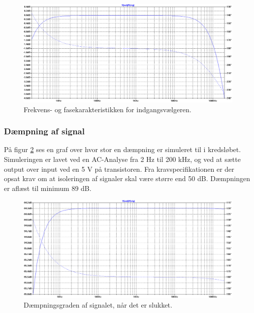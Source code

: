 \begin{figure}[h]
\centering
\includegraphics[width=\textwidth]{teknisk/indgangsvaelger/simulering/frekvenskarakteristik.png}
\caption{Frekvens- og fasekarakteristikken for indgangsvælgeren.}
\label{indgangsvaelger_frekvenskarakteristik}
\end{figure}

\subsubsection*{Dæmpning af signal}
På figur \ref{indgangsvaelger_daempniing} ses en graf over hvor stor en dæmpning er simuleret til i kredsløbet. Simuleringen er lavet ved en AC-Analyse fra 2 Hz til 200 kHz, og ved at sætte output over input ved en 5 V på transistoren. Fra kravspecifikationen er der opsat krav om at isoleringen af signaler skal være større end 50 dB. Dæmpningen er aflæst til minimum 89 dB.
\begin{figure}[h]
\centering
\includegraphics[width=\textwidth]{teknisk/indgangsvaelger/simulering/daempning_af_signal.png}
\caption{Dæmpningsgraden af signalet, når det er slukket.}
\label{indgangsvaelger_daempniing}
\end{figure}

